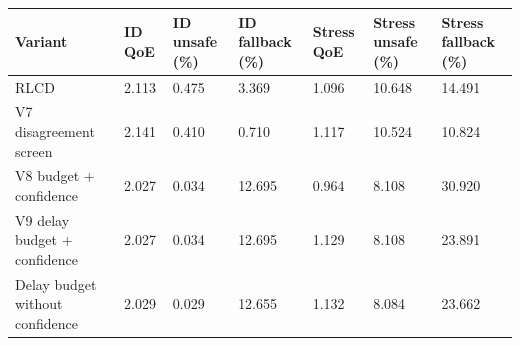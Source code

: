 \begin{tabular}{lllllll}
\toprule
Variant & ID QoE & ID unsafe (\%) & ID fallback (\%) & Stress QoE & Stress unsafe (\%) & Stress fallback (\%) \\
\midrule
RLCD & 2.113 & 0.475 & 3.369 & 1.096 & 10.648 & 14.491 \\
V7 disagreement screen & 2.141 & 0.410 & 0.710 & 1.117 & 10.524 & 10.824 \\
V8 budget + confidence & 2.027 & 0.034 & 12.695 & 0.964 & 8.108 & 30.920 \\
V9 delay budget + confidence & 2.027 & 0.034 & 12.695 & 1.129 & 8.108 & 23.891 \\
Delay budget without confidence & 2.029 & 0.029 & 12.655 & 1.132 & 8.084 & 23.662 \\
\bottomrule
\end{tabular}
